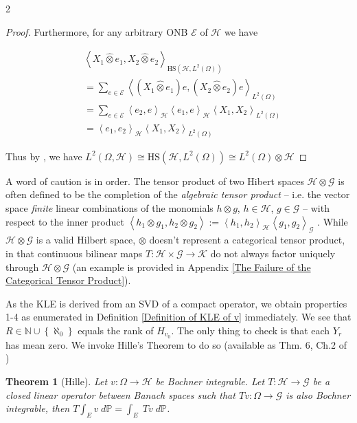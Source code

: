 \documentclass{article}
\newenvironment{mycoloredtext}{
    \color{blue} %
}{
}
\newtheorem{theorem}{Theorem}
\numberwithin{theorem}{section}
\numberwithin{lemma}{section}
\numberwithin{definition}{section}
\numberwithin{assumption}{section}
\numberwithin{proposition}{section}
\numberwithin{remark}{section}
\numberwithin{corollary}{section}
\numberwithin{conjecture}{section}
\numberwithin{example}{section}
\newcommand{\N}{\mathbb{N}}
\newcommand{\bset}[1]{\left \lbrace #1 \right \rbrace}
\newcommand{\aset}[1]{\left \langle #1 \right \rangle}
\newcommand{\CH}{\mathcal H}
\begin{document}
\begin{multicols*}{2}
\begin{proof}
    Furthermore, for any arbitrary ONB $\mathscr E$ of $\mathcal H$ we have  

    \begin{align*}
        & \aset{X_1 \widehat \otimes e_1, X_2 \widehat \otimes e_2}_{\text{HS}(\CH, L^2(\Omega))} 
       \\  &= 
       \sum_{e \in \mathscr E} 
         \aset{(X_1 \widehat \otimes e_1)e, (X_2 \widehat \otimes e_2)e}_{L^2(\Omega)} 
         \\&= 
          \sum_{e \in \mathscr E} \aset{e_2, e}_\CH \aset{e_1, e}_\CH  
         \aset{X_1, X_2}_{L^2(\Omega)} 
         \\&= 
        \aset{e_1, e_2}_\CH \aset{X_1, X_2}_{L^2(\Omega)}
    \end{align*}

    
    
    Thus by \cite{Berberian2014}, we have $L^2(\Omega, \mathcal H) \cong \text{HS}(\mathcal H, L^2(\Omega)) \cong L^2(\Omega) \otimes \mathcal H$
\end{proof}

    A word of caution is in order. The tensor product of two Hibert spaces $\mathcal H \otimes \mathcal G$ is often defined to be the completion of the \textit{algebraic tensor product} -- i.e. the vector space \textit{finite} linear combinations of the monomials $h \otimes g$, $h \in \mathcal H$, $g \in \mathcal G$ -- with respect to the inner product $\aset{h_1 \otimes g_1, h_2 \otimes g_2} := \aset{h_1,h_2}_\mathcal H \aset{g_1, g_2}_\mathcal G$ \cite{alexanderian2013}. While $\mathcal H \otimes \mathcal G$ is a valid Hilbert space, $\otimes$ doesn't represent a categorical tensor product, in that continuous bilinear maps $T: \mathcal H \times \mathcal G \to \mathcal K$ do not always factor uniquely through $\mathcal H \otimes \mathcal G$ (an example is provided in Appendix \ref{The Failure of the Categorical Tensor Product}). 

As the KLE is derived from an SVD of a compact operator, we obtain properties 1-4 as enumerated in Definition \ref{Definition of KLE of v} immediately. We see that $R \in \N \cup \bset{\aleph_0}$ equals the rank of $H_{v_0}$. The only thing to check is that each $Y_r$ has mean zero. We invoke Hille's Theorem to do so (available as Thm. 6, Ch.2 of \cite{DiestelUhl1977})

\begin{theorem} [Hille]
    Let $v: \Omega \to \mathcal H$ be Bochner integrable. Let $T: \mathcal H \to \mathcal G$ be a closed linear operator between Banach spaces such that $Tv: \Omega \to \mathcal G$ is also Bochner integrable, then $T \int_E v \; d \mathbb P = \int_E \;  Tv \; d \mathbb P$. 
\end{theorem}


\end{multicols*}
\end{document}
